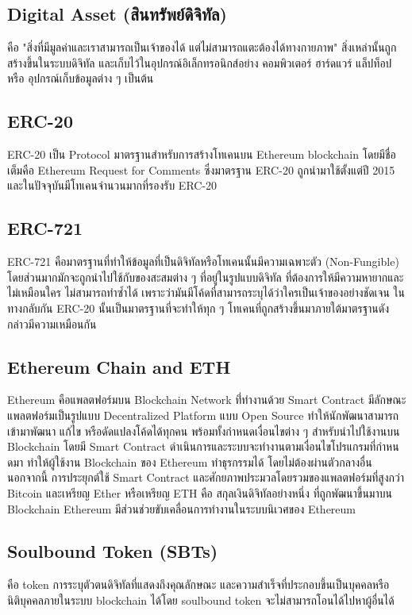 \documentclass[12pt,oneside,openright,a4paper]{cpe-thai-project}
\begin{document}
\subsection{Digital Asset (สินทรัพย์ดิจิทัล)  \cite{digital-asset}}
\tab คือ "สิ่งที่มีมูลค่าและเราสามารถเป็นเจ้าของได้ แต่ไม่สามารถแตะต้องได้ทางกายภาพ" สิ่งเหล่านั้นถูกสร้างขึ้นในระบบดิจิทัล และเก็บไว้ในอุปกรณ์อิเล็กทรอนิกส์อย่าง คอมพิวเตอร์ ฮาร์ดแวร์ แล็ปท็อป หรือ อุปกรณ์เก็บข้อมูลต่าง ๆ เป็นต้น

\subsection{ERC-20 \cite{erc20}}
\tab ERC-20 เป็น Protocol มาตรฐานสําหรับการสร้างโทเคนบน Ethereum blockchain โดยมีชื่อเต็มคือ Ethereum Request for Comments ซึ่งมาตรฐาน ERC-20 ถูกนํามาใช้ตั้งแต่ปี 2015 และในปัจจุบันมีโทเคนจํานวนมากที่รองรับ ERC-20

\subsection{ERC-721  \cite{erc721}}
\tab ERC-721 คือมาตรฐานที่ทำให้ข้อมูลที่เป็นดิจิทัลหรือโทเคนนั้นมีความเฉพาะตัว (Non-Fungible) โดยส่วนมากมักจะถูกนำไปใช้กับของสะสมต่าง ๆ ที่อยู่ในรูปแบบดิจิทัล ที่ต้องการให้มีความหายากและไม่เหมือนใคร ไม่สามารถทำซ้ำได้ เพราะว่ามันมีโค้ดที่สามารถระบุได้ว่าใครเป็นเจ้าของอย่างชัดเจน ในทางกลับกัน ERC-20 นั้นเป็นมาตรฐานที่จะทำให้ทุก ๆ โทเคนที่ถูกสร้างขึ้นมาภายใต้มาตรฐานดังกล่าวมีความเหมือนกัน



\subsection{Ethereum Chain and ETH\cite{eth}}
\tab Ethereum คือแพลตฟอร์มบน Blockchain Network ที่่ทํางานด้วย Smart Contract มีลักษณะแพลตฟอร์มเป็นรูปแบบ Decentralized Platform แบบ Open Source ทําให้นักพัฒนาสามารถเข้ามาพัฒนา แก้ไข หรือดัดแปลงโค้ดได้ทุกคน พร้อมทั้งกําหนดเงื่อนไขต่าง ๆ สําหรับนําไปใช้งานบน Blockchain โดยมี Smart Contract ดําเนินการและระบบจะทํางานตามเงื่อนไขโปรแกรมที่กําหนดมา ทําให้ผู้ใช้งาน Blockchain ของ Ethereum ทําธุรกรรมได้ โดยไม่ต้องผ่านตัวกลางอื่น นอกจากนี้ การประยุกต์ใช้ Smart Contract และศักยภาพประมวลโดยรวมของแพลตฟอร์มที่สูงกว่า Bitcoin และเหรียญ Ether หรือเหรียญ ETH คือ สกุลเงินดิจิทัลอย่างหนึ่ง ที่ถูกพัฒนาขึ้นมาบน Blockchain Ethereum มีส่วนช่วยขับเคลื่อนการทํางานในระบบนิเวศของ Ethereum

\subsection{Soulbound Token (SBTs)\cite{sbts}}
\tab คือ token การระบุตัวตนดิจิทัลที่แสดงถึงคุณลักษณะ และความสำเร็จที่ประกอบขึ้นเป็นบุคคลหรือนิติบุคคลภายในระบบ blockchain ได้โดย soulbound token จะไม่สามารถโอนได้ไปหาผู้อื่นได้
\end{document}
